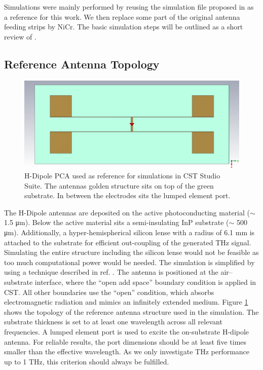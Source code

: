 Simulations were mainly performed by reusing the simulation file proposed in \cite{nandiErAsInAlGaAsPhotoconductors2021} as a reference for this work. We then replace some part of the original antenna feeding strips by NiCr. The basic simulation steps will be outlined as a short review of \cite{nandiErAsInAlGaAsPhotoconductors2021}.   

\subsection{Reference Antenna Topology}

\begin{figure}
    \centering
    \includegraphics[width=\linewidth]{figures/H_Dipole_ref.png}
    \caption{H-Dipole PCA used as reference for simulations in CST Studio Suite. The antennas golden structure sits on top of the green substrate. In between the electrodes sits the lumped element port.}
    \label{ref_h_dipole_for_sim}
\end{figure}

The H-Dipole antennas are deposited on the active photoconducting material ($\sim$ \num{1.5} \si{\micro\meter}). Below the active material sits a semi-insulating InP substrate ($\sim$ \num{500} \si{\micro\meter}). Additionally, a hyper-hemispherical silicon lense with a radius of \num{6.1} \si{\milli\meter} is attached to the substrate for efficient out-coupling of the generated THz signal. Simulating the entire structure including the silicon lense would not be feasible as too much computational power would be needed. The simulation is simplified by using a technique described in  ref. \cite{llombartTHzTimeDomainSensing2012,garufoNortonEquivalentCircuit2018}. The antenna is positioned at the air–substrate interface, where the \enquote{open add space} boundary condition is applied in CST. All other boundaries use the \enquote{open} condition, which absorbs electromagnetic radiation and mimics an infinitely extended medium. Figure \ref{ref_h_dipole_for_sim} shows the topology of the reference antenna structure used in the simulation. The substrate thickness is set to at least one wavelength across all relevant frequencies. A lumped element port is used to excite the on-substrate H-dipole antenna. For reliable results, the port dimensions should be at least five times smaller than the effective wavelength. As we only investigate THz performance up to \num{1} \si{\tera\hertz}, this criterion should always be fulfilled. 

